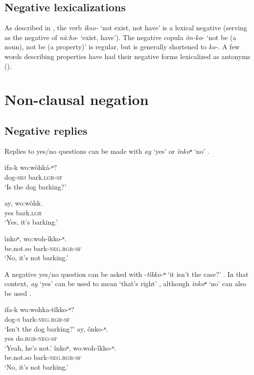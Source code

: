 \documentclass[output=paper,colorlinks,citecolor=brown]{langscibook}
\begin{document}
\subsection{Negative lexicalizations}\label{sec:koa:2.5}

As described in , the verb \textit{ǐkso-} ‘not exist, not have’ is a lexical negative (serving as the negative of \textit{n\v{a}:ho}- ‘exist, have’). The negative copula \textit{\v{o}n-ko}- ‘not be (a noun), not be (a property)’ is regular, but is generally shortened to \textit{ko-}. A few words describing properties have had their negative forms lexicalized as antonyms ().


\section{Non-clausal negation}\label{sec:koa:3}
\subsection{Negative replies}\label{sec:koa:3.1}

Replies to yes/no questions  can be made with \textit{ay} ‘yes’ or \textit{\v{i}nkoⁿ} ‘no’ . 

\ea\label{ex:koa:35}
    \gll ifa-k  wo:wòhká-ⁿ?\\ 
         dog-\textsc{sbj}  bark.\textsc{lgr-sf} \\
    \glt ‘Is the dog barking?’
\z 

\ea\label{ex:koa:36}
    \ea\label{ex:koa:36a}
        \gll ay,  wo:wòhk. \\ 
             yes  bark.\textsc{lgr} \\
        \glt  ‘Yes, it’s barking.’
    
    \ex\label{ex:koa:36b}
        \gll \v{i}nkoⁿ,    wo:woh-\v{i}kko-ⁿ.\\
             be.not.so  bark-\textsc{neg.rgr-sf} \\
        \glt ‘No, it’s not barking.’
    \z
\z 

A negative yes/no question can be asked with -\textit{t\v{i}kko-ⁿ} ‘it isn’t the case?’ . In that context, \textit{ay} ‘yes’ can be used to mean ‘that’s right’ , although \textit{\v{i}nkoⁿ} ‘no’ can also be used .

\ea\label{ex:koa:37} 
    \gll ifa-k  wo:wohka-t\v{i}kko-ⁿ?\\ 
         dog-\textsc{s}  bark-\textsc{neg.rgr-sf} \\
    \glt ‘Isn’t the dog barking?’
\z 
\ea\label{ex:koa:38}
    \ea\label{ex:koa:38a}
        \gll ay,  \v{o}nko-ⁿ.\\ 
             yes  do.\textsc{rgr-neg-sf} \\
        \glt ‘Yeah, he’s not.’  
    \ex\label{ex:koa:38b}
        \gll \v{i}nkoⁿ,    wo:woh-\v{i}kko-ⁿ.\\
             be.not.so  bark-\textsc{neg.rgr-sf} \\
        \glt ‘No, it’s not barking.’
    \z
\z 
\end{document}
